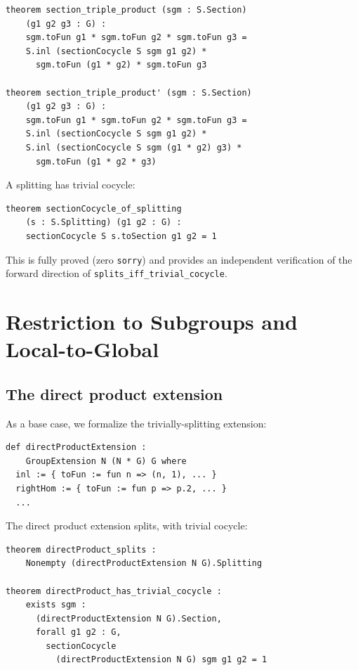 \documentclass[11pt]{article}
\newcommand{\lean}[1]{\texttt{#1}}
\begin{document}
\begin{lstlisting}
theorem section_triple_product (sgm : S.Section)
    (g1 g2 g3 : G) :
    sgm.toFun g1 * sgm.toFun g2 * sgm.toFun g3 =
    S.inl (sectionCocycle S sgm g1 g2) *
      sgm.toFun (g1 * g2) * sgm.toFun g3

theorem section_triple_product' (sgm : S.Section)
    (g1 g2 g3 : G) :
    sgm.toFun g1 * sgm.toFun g2 * sgm.toFun g3 =
    S.inl (sectionCocycle S sgm g1 g2) *
    S.inl (sectionCocycle S sgm (g1 * g2) g3) *
      sgm.toFun (g1 * g2 * g3)
\end{lstlisting}

\begin{theorem}\label{thm:cocycle-splitting}
A splitting has trivial cocycle:
\begin{lstlisting}
theorem sectionCocycle_of_splitting
    (s : S.Splitting) (g1 g2 : G) :
    sectionCocycle S s.toSection g1 g2 = 1
\end{lstlisting}
\end{theorem}

\noindent
This is fully proved (zero \lean{sorry}) and provides an independent verification
of the forward direction of \lean{splits\_iff\_trivial\_cocycle}.

\section{Restriction to Subgroups and Local-to-Global}\label{sec:local}

\subsection{The direct product extension}\label{sec:direct-product}

As a base case, we formalize the trivially-splitting extension:

\begin{definition}\label{def:direct-product}
\begin{lstlisting}
def directProductExtension :
    GroupExtension N (N * G) G where
  inl := { toFun := fun n => (n, 1), ... }
  rightHom := { toFun := fun p => p.2, ... }
  ...
\end{lstlisting}
\end{definition}

\begin{theorem}\label{thm:direct-splits}
The direct product extension splits, with trivial cocycle:
\begin{lstlisting}
theorem directProduct_splits :
    Nonempty (directProductExtension N G).Splitting

theorem directProduct_has_trivial_cocycle :
    exists sgm :
      (directProductExtension N G).Section,
      forall g1 g2 : G,
        sectionCocycle
          (directProductExtension N G) sgm g1 g2 = 1
\end{lstlisting}
\end{theorem}
\end{document}
